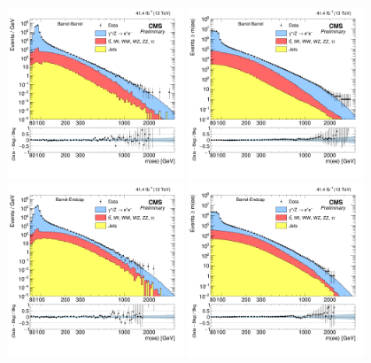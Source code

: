 \begin{figure}[!htbp]
  \begin{center}
    \includegraphics[width=0.47\textwidth]{figures/Zprime/2017/mass/massHistEBEB}
    \includegraphics[width=0.47\textwidth]{figures/Zprime/2017/mass/cMassHistEBEB}
    \includegraphics[width=0.47\textwidth]{figures/Zprime/2017/mass/massHistEBEE}
    \includegraphics[width=0.47\textwidth]{figures/Zprime/2017/mass/cMassHistEBEE}

\end{center}
\end{figure}

